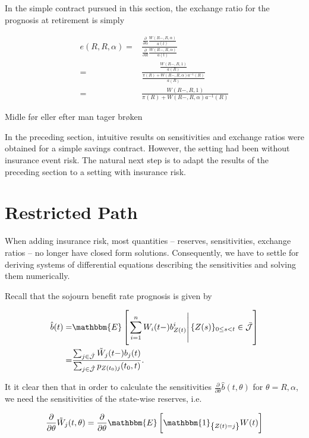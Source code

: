 \documentclass{book}
\newcommand{\1}[1]{\mathbbm{1}_{\left\lbrace #1 \right\rbrace}}
\newcommand{\expec}[1][def]{\mathbbm{E} \left[ #1 \right]}
\newcommand{\econd}[2][def]{\mathbbm{E} \left[ \left. #1 \right| #2 \right]}
\theoremstyle{break}
\theoremstyle{remark}
\newenvironment{remark}
  {\pushQED{\qed}\renewcommand{\qedsymbol}{\scalebox{1.4}{$\circ$}}\remarkx}
  {\popQED\endremarkx}
\numberwithin{equation}{section}
\begin{document}
In the simple contract pursued in this section, the exchange ratio for the prognosis at retirement is simply

\begin{align*}
	e(R,R,\alpha) =& \frac{\frac{\partial}{\partial \alpha }\frac{W(R-,R,\alpha)}{a(t)}}{\frac{\partial}{\partial R }\frac{W(R-,R,\alpha)}{a(t)}} \\
	=& \frac{\frac{W(R-,R,1)}{a(R)}}{\frac{\pi (R) + W(R-,R,\alpha) a^{-1}(R)}{a(R)}} \\
	=& \frac{W(R-,R,1)}{\pi (R) + W(R-,R,\alpha) a^{-1}(R)}
\end{align*}



\begin{remark}
	Midle før eller efter man tager brøken
\end{remark}

In the preceding section, intuitive results on sensitivities and exchange ratios were obtained for a simple savings contract. However, the setting had been without insurance event risk. The natural next step is to adapt the results of the preceding section to a setting with insurance risk.

\section{Restricted Path}

When adding insurance risk, most quantities -- reserves, sensitivities, exchange ratios -- no longer have closed form solutions. Consequently, we have to settle for deriving systems of differential equations describing the sensitivities and solving them numerically.

Recall that the sojourn benefit rate prognosis is given by

\begin{align*}
	\hat{b}(t)=& \econd[\sum_{i=1}^n W_i(t-)b_{Z(t)}^i]{\{Z(s) \}_{0 \leq s < t} \in \bar{\mathcal{J}}} \\
	=& \frac{\sum_{j \in \hat{\mathcal{J}}} \tilde{W}_j(t-) b_j(t)}{\sum_{j \in \hat{\mathcal{J}}} p_{Z(t_0)j}(t_0,t)}.
\end{align*}

It it clear then that in order to calculate the sensitivities $\frac{\partial}{\partial \theta} \hat{b}(t,\theta)$ for $\theta=R,\alpha$, we need the sensitivities of the state-wise reserves, i.e.

\begin{align*}
	\frac{\partial}{\partial \theta} \tilde{W}_j(t,\theta) = \frac{\partial}{\partial \theta} \expec[\1{Z(t)=j} W(t)]
\end{align*}
\end{document}

